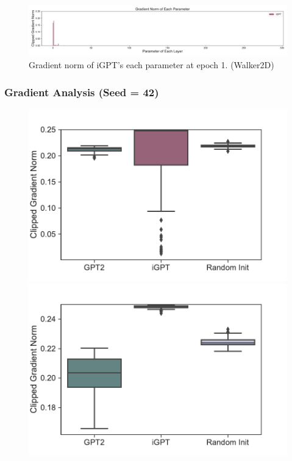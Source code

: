 \documentclass{article}
\begin{document}
\begin{figure}[H]
    \centering
        \includegraphics[width=\linewidth]{figs/gradnorm_perparam_1_igpt_walker2d_medium_666.pdf}
    \caption{Gradient norm of iGPT's each parameter at epoch 1. (Walker2D)}
\end{figure}

\subsubsection{Gradient Analysis (Seed = 42)}
\begin{figure}[H]
    \centering
    \begin{minipage}[b]{0.32\linewidth}
        \includegraphics[width=\linewidth]{figs/gradnorms_1_gpt2_igpt_dt_hopper_medium_42.pdf}
    \end{minipage}
    \begin{minipage}[b]{0.32\linewidth}
        \includegraphics[width=\linewidth]{figs/gradnorms_1_gpt2_igpt_dt_halfcheetah_medium_42.pdf}

\end{minipage}
\end{figure}
\end{document}
